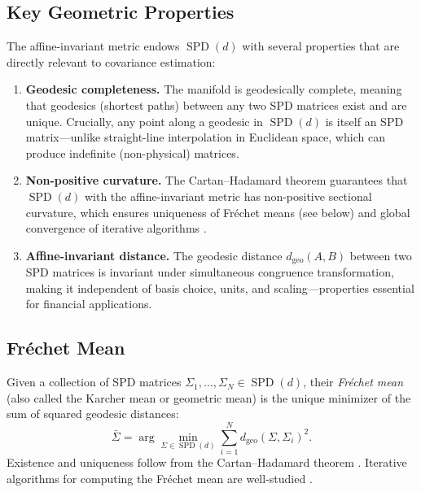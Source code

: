 \documentclass[12pt,a4paper]{article}
\DeclareMathOperator{\SPD}{SPD}
\begin{document}
\subsection{Key Geometric Properties}

The affine-invariant metric endows $\SPD(d)$ with several properties that
are directly relevant to covariance estimation:

\begin{enumerate}[label=(\roman*)]
    \item \textbf{Geodesic completeness.} The manifold is geodesically
    complete, meaning that geodesics (shortest paths) between any two SPD
    matrices exist and are unique. Crucially, any point along a geodesic
    in $\SPD(d)$ is itself an SPD matrix---unlike straight-line interpolation
    in Euclidean space, which can produce indefinite (non-physical) matrices.

    \item \textbf{Non-positive curvature.} The Cartan--Hadamard theorem
    guarantees that $\SPD(d)$ with the affine-invariant metric has
    non-positive sectional curvature, which ensures uniqueness of
    Fr\'{e}chet means (see below) and global convergence of iterative
    algorithms \citep{Moakher2005}.

    \item \textbf{Affine-invariant distance.} The geodesic distance
    $d_{\text{geo}}(A, B)$ between two SPD matrices is invariant under
    simultaneous congruence transformation, making it independent of
    basis choice, units, and scaling---properties essential for
    financial applications.
\end{enumerate}

\subsection{Fr\'{e}chet Mean}

Given a collection of SPD matrices $\Sigma_1, \ldots, \Sigma_N \in \SPD(d)$,
their \emph{Fr\'{e}chet mean} (also called the Karcher mean or geometric
mean) is the unique minimizer of the sum of squared geodesic distances:
\begin{equation}\label{eq:frechet}
    \bar{\Sigma} = \arg\min_{\Sigma \in \SPD(d)} \sum_{i=1}^N
    d_{\text{geo}}(\Sigma, \Sigma_i)^2.
\end{equation}
Existence and uniqueness follow from the Cartan--Hadamard theorem
\citep{Moakher2005}. Iterative algorithms for computing the Fr\'{e}chet
mean are well-studied \citep{Bini2013}.
\end{document}
